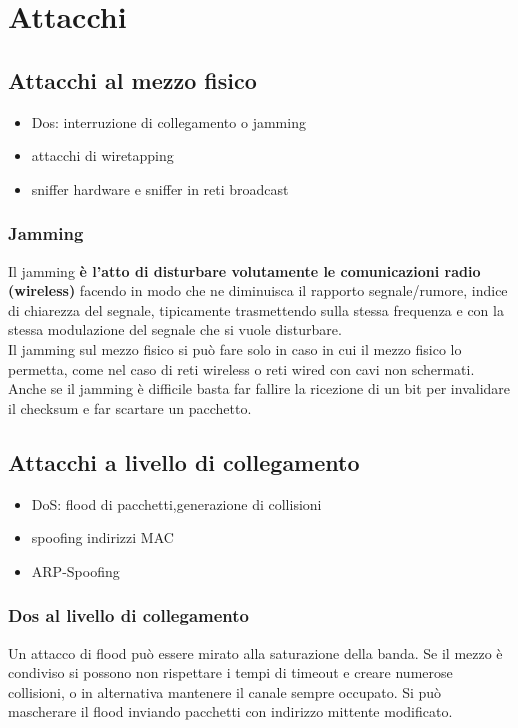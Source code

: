 \documentclass[12pt]{article}
\begin{document}
	\section{Attacchi}
		\subsection{Attacchi al mezzo fisico}
			\begin{itemize}
				\item Dos: interruzione di collegamento o jamming
				\item attacchi di wiretapping 
				\item sniffer hardware e sniffer in reti broadcast
			\end{itemize}
			\subsubsection{Jamming}
				Il jamming \textbf{è l'atto di disturbare volutamente le comunicazioni radio (wireless)} facendo in modo che ne diminuisca il rapporto segnale/rumore, indice di chiarezza del segnale, tipicamente trasmettendo sulla stessa frequenza e con la stessa modulazione del segnale che si vuole disturbare. \\
				Il jamming sul mezzo fisico si può fare solo in caso in cui il mezzo fisico lo permetta, come nel caso di reti wireless o reti wired con cavi non schermati. Anche se il jamming è difficile basta far fallire la ricezione di un bit per invalidare il checksum e far scartare un pacchetto.
		\subsection{Attacchi a livello di collegamento}
			\begin{itemize}
				\item DoS: flood di pacchetti,generazione di collisioni
				\item spoofing indirizzi MAC
				\item ARP-Spoofing
			\end{itemize}
			\subsubsection{Dos al livello di collegamento}
				Un attacco di flood può essere mirato alla saturazione della banda. Se il mezzo è condiviso si possono non rispettare i tempi di timeout e creare numerose collisioni, o in alternativa mantenere il canale sempre occupato. Si può mascherare il flood inviando pacchetti con indirizzo mittente modificato.
\end{document}
